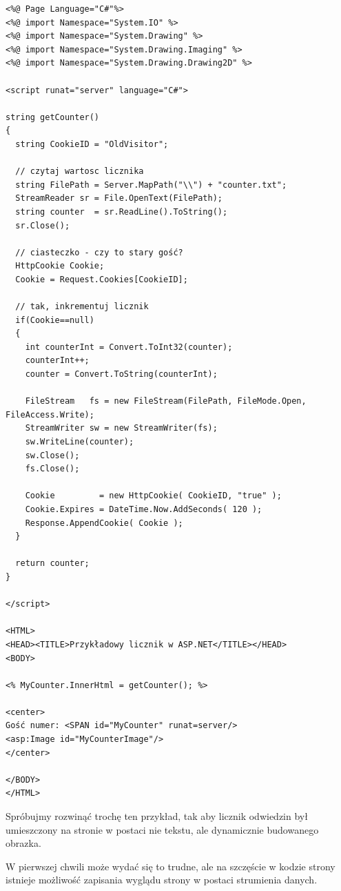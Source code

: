 \begin{scriptsize}
\begin{verbatim}
<%@ Page Language="C#"%> 
<%@ import Namespace="System.IO" %> 
<%@ import Namespace="System.Drawing" %> 
<%@ import Namespace="System.Drawing.Imaging" %> 
<%@ import Namespace="System.Drawing.Drawing2D" %> 

<script runat="server" language="C#">

string getCounter()
{ 
  string CookieID = "OldVisitor";

  // czytaj wartosc licznika
  string FilePath = Server.MapPath("\\") + "counter.txt"; 
  StreamReader sr = File.OpenText(FilePath); 
  string counter  = sr.ReadLine().ToString(); 
  sr.Close(); 

  // ciasteczko - czy to stary gość?
  HttpCookie Cookie; 
  Cookie = Request.Cookies[CookieID]; 

  // tak, inkrementuj licznik
  if(Cookie==null) 
  { 
    int counterInt = Convert.ToInt32(counter); 
    counterInt++; 
    counter = Convert.ToString(counterInt); 

    FileStream   fs = new FileStream(FilePath, FileMode.Open, FileAccess.Write); 
    StreamWriter sw = new StreamWriter(fs); 
    sw.WriteLine(counter); 
    sw.Close(); 
    fs.Close(); 

    Cookie         = new HttpCookie( CookieID, "true" ); 
    Cookie.Expires = DateTime.Now.AddSeconds( 120 ); 
    Response.AppendCookie( Cookie ); 
  } 

  return counter; 
} 

</script> 

<HTML>
<HEAD><TITLE>Przykładowy licznik w ASP.NET</TITLE></HEAD>
<BODY>

<% MyCounter.InnerHtml = getCounter(); %>

<center>
Gość numer: <SPAN id="MyCounter" runat=server/>
<asp:Image id="MyCounterImage"/>
</center>

</BODY>
</HTML>
\end{verbatim}
\end{scriptsize}

Spróbujmy rozwinąć trochę ten przykład, tak aby licznik odwiedzin był umieszczony na stronie
w postaci nie tekstu, ale dynamicznie budowanego obrazka.

W pierwszej chwili może wydać się to trudne, ale na szczęście w kodzie strony istnieje możliwość
zapisania wyglądu strony w postaci strumienia danych. 

